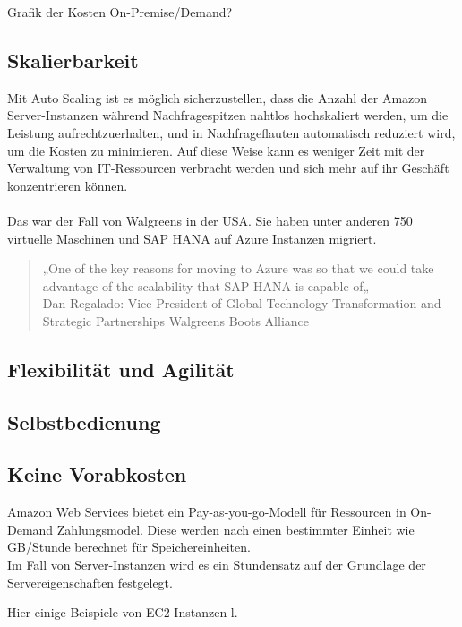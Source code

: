 Grafik der Kosten On-Premise/Demand?

\subsection{Skalierbarkeit}
Mit Auto Scaling ist es möglich sicherzustellen, dass die Anzahl der Amazon Server-Instanzen während
Nachfragespitzen nahtlos hochskaliert werden, um die Leistung aufrechtzuerhalten, und in
Nachfrageflauten automatisch reduziert wird, um die Kosten zu minimieren.
Auf diese Weise kann es weniger Zeit mit der Verwaltung von IT-Ressourcen verbracht werden und sich mehr auf ihr Geschäft konzentrieren können.
\\\\
Das war der Fall von Walgreens in der USA.
Sie haben unter anderen 750 virtuelle Maschinen und SAP HANA auf Azure Instanzen migriert.

\begin{quote}
      „One of the key reasons for moving to Azure was so that we could take advantage of the scalability that SAP HANA is capable of„
      \\
      Dan Regalado: Vice President of Global Technology Transformation and Strategic Partnerships Walgreens Boots Alliance
            {\cite{AZ01}}
\end{quote}

\subsection{Flexibilität und Agilität}

\subsection{Selbstbedienung}

\subsection{Keine Vorabkosten}
Amazon Web Services bietet ein Pay-as-you-go-Modell für Ressourcen in On-Demand Zahlungsmodel.
Diese werden nach einen bestimmter Einheit wie GB/Stunde berechnet für Speichereinheiten. 
\\
Im Fall von Server-Instanzen wird es ein Stundensatz auf der Grundlage der Servereigenschaften festgelegt.  

Hier einige Beispiele von EC2-Instanzen l.

